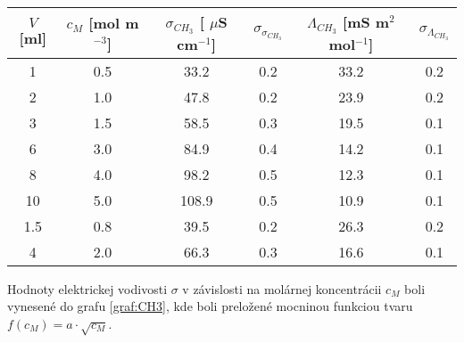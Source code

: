 \documentclass{article}
\begin{document}
\begin{table}[H]
\centering
{} 
\label{tab:CH3}
\begin{tabular}{|c|c|c|c|c|c|} 
\hline
$V$ [ml] & $c_M$ [mol m$^{-3}$] & ${\sigma}_{CH_3}$ [ $\mu$S cm$^{-1}$] &  ${\sigma}_{{\sigma}_{CH_3}}$   & ${\Lambda}_{CH_3}$ [mS m$^2$ mol$^{-1}$] &${\sigma}_{{\Lambda}_{CH_3}}$     \\ \hline
1      & 0.5                  & 33.2                                 & 0.2 & 33.2                                    & 0.2 \\ \hline
2      & 1.0                  & 47.8                                 & 0.2 & 23.9                                    & 0.2 \\ \hline
3      & 1.5                  & 58.5                                 & 0.3 & 19.5                                    & 0.1 \\ \hline
6      & 3.0                  & 84.9                                 & 0.4 & 14.2                                    & 0.1 \\ \hline
8      & 4.0                  & 98.2                                 & 0.5 & 12.3                                    & 0.1 \\ \hline
10     & 5.0                    & 108.9                                & 0.5 & 10.9                                    & 0.1 \\ \hline
1.5    & 0.8                 & 39.5                                 & 0.2 & 26.3                                    & 0.2 \\ \hline
4      & 2.0                  & 66.3                                 & 0.3 & 16.6                                    & 0.1 \\ \hline
\end{tabular}
\end{table}

Hodnoty elektrickej vodivosti $\sigma$ v závislosti na molárnej koncentrácii $c_M$ boli vynesené do grafu \ref{graf:CH3}, kde boli preložené mocninou funkciou tvaru $f(c_M) = a{\cdot}\sqrt{c_M}$. 

\begin{graph}[H]
		\centering
		
		\caption{Závislosť vodivosti $\sigma$ CH$_3$COOH na molárnej koncentrácii $c_M$}
		\label{graf:CH3}
\end{graph} 
\end{document}
